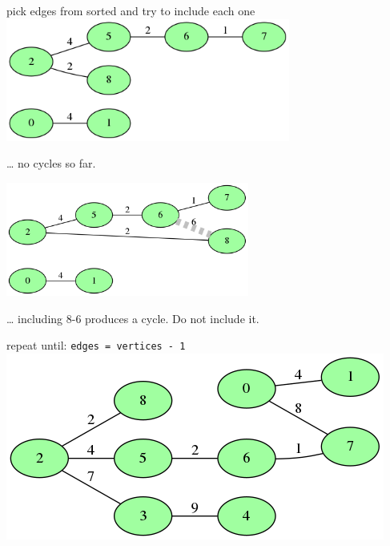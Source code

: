 \documentclass[presentation]{beamer}
\begin{document}
\begin{frame}[label={sec:orgheadline9}]{pick edges from sorted and try to include each one}
\includegraphics[width=0.7\textwidth]{images/example-1-step-1.png}

\ldots{} no cycles so far.

\includegraphics[width=0.6\textwidth]{images/example-1-step-3.png}

\ldots{} including 8-6 produces a cycle. Do not include it.
\end{frame}

\begin{frame}[fragile,label={sec:orgheadline10}]{repeat until: \texttt{edges = vertices - 1}}
 \includegraphics[width=.9\linewidth]{images/example-1-step-4.png}
\end{frame}
\end{document}
